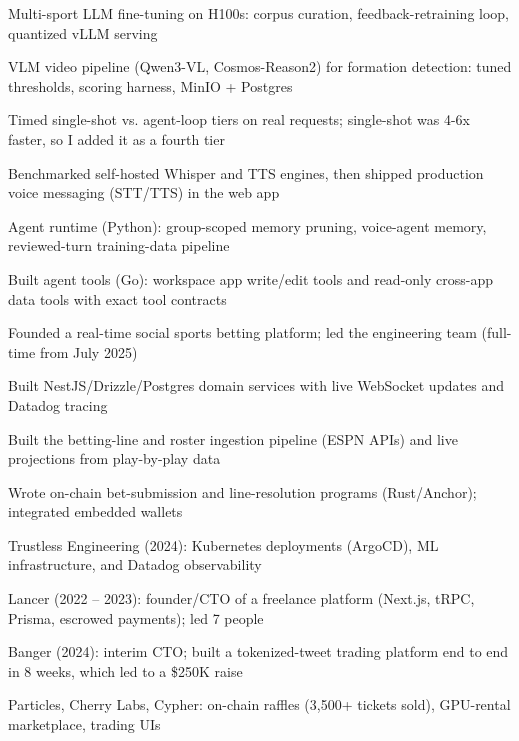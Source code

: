\documentclass[print]{jack-resume}
\begin{document}
\begin{tightemize}
    \item Multi-sport LLM fine-tuning on H100s: corpus curation, feedback-retraining loop, quantized vLLM serving
    \item VLM video pipeline (Qwen3-VL, Cosmos-Reason2) for formation detection: tuned thresholds, scoring harness, MinIO + Postgres
    \item Timed single-shot vs. agent-loop tiers on real requests; single-shot was 4-6x faster, so I added it as a fourth tier
    \item Benchmarked self-hosted Whisper and TTS engines, then shipped production voice messaging (STT/TTS) in the web app
    \item Agent runtime (Python): group-scoped memory pruning, voice-agent memory, reviewed-turn training-data pipeline
    \item Built agent tools (Go): workspace app write/edit tools and read-only cross-app data tools with exact tool contracts
\end{tightemize}
\sectionsep

\begin{tightemize}
    \item Founded a real-time social sports betting platform; led the engineering team (full-time from July 2025)
    \item Built NestJS/Drizzle/Postgres domain services with live WebSocket updates and Datadog tracing
    \item Built the betting-line and roster ingestion pipeline (ESPN APIs) and live projections from play-by-play data
    \item Wrote on-chain bet-submission and line-resolution programs (Rust/Anchor); integrated embedded wallets
\end{tightemize}
\sectionsep

\begin{tightemize}
    \item Trustless Engineering (2024): Kubernetes deployments (ArgoCD), ML infrastructure, and Datadog observability
    \item Lancer (2022 – 2023): founder/CTO of a freelance platform (Next.js, tRPC, Prisma, escrowed payments); led 7 people
    \item Banger (2024): interim CTO; built a tokenized-tweet trading platform end to end in 8 weeks, which led to a \$250K raise
    \item Particles, Cherry Labs, Cypher: on-chain raffles (3,500+ tickets sold), GPU-rental marketplace, trading UIs
\end{tightemize}
\sectionsep
\end{document}
